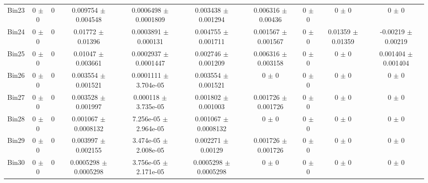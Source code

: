 \begin{tabular}{@{\extracolsep{4pt}}lccccccccc@{}}
     Bin23 & 0 $\pm$ 0 & 0 & 0.009754 $\pm$ 0.004548 & 0.0006498 $\pm$ 0.0001809 & 0.003438 $\pm$ 0.001294 & 0.006316 $\pm$ 0.00436 & 0 $\pm$ 0 & 0 $\pm$ 0 & 0 $\pm$ 0 \\ 
     Bin24 & 0 $\pm$ 0 & 0 & 0.01772 $\pm$ 0.01396 & 0.0003891 $\pm$ 0.000131 & 0.004755 $\pm$ 0.001711 & 0.001567 $\pm$ 0.001567 & 0 $\pm$ 0 & 0.01359 $\pm$ 0.01359 & -0.00219 $\pm$ 0.00219 \\ 
     Bin25 & 0 $\pm$ 0 & 0 & 0.01047 $\pm$ 0.003661 & 0.0002937 $\pm$ 0.0001447 & 0.002746 $\pm$ 0.001209 & 0.006316 $\pm$ 0.003158 & 0 $\pm$ 0 & 0 $\pm$ 0 & 0.001404 $\pm$ 0.001404 \\ 
     Bin26 & 0 $\pm$ 0 & 0 & 0.003554 $\pm$ 0.001521 & 0.0001111 $\pm$ 3.704e-05 & 0.003554 $\pm$ 0.001521 & 0 $\pm$ 0 & 0 $\pm$ 0 & 0 $\pm$ 0 & 0 $\pm$ 0 \\ 
     Bin27 & 0 $\pm$ 0 & 0 & 0.003528 $\pm$ 0.001997 & 0.000118 $\pm$ 3.735e-05 & 0.001802 $\pm$ 0.001003 & 0.001726 $\pm$ 0.001726 & 0 $\pm$ 0 & 0 $\pm$ 0 & 0 $\pm$ 0 \\ 
     Bin28 & 0 $\pm$ 0 & 0 & 0.001067 $\pm$ 0.0008132 & 7.256e-05 $\pm$ 2.964e-05 & 0.001067 $\pm$ 0.0008132 & 0 $\pm$ 0 & 0 $\pm$ 0 & 0 $\pm$ 0 & 0 $\pm$ 0 \\ 
     Bin29 & 0 $\pm$ 0 & 0 & 0.003997 $\pm$ 0.002155 & 3.474e-05 $\pm$ 2.008e-05 & 0.002271 $\pm$ 0.00129 & 0.001726 $\pm$ 0.001726 & 0 $\pm$ 0 & 0 $\pm$ 0 & 0 $\pm$ 0 \\ 
     Bin30 & 0 $\pm$ 0 & 0 & 0.0005298 $\pm$ 0.0005298 & 3.756e-05 $\pm$ 2.171e-05 & 0.0005298 $\pm$ 0.0005298 & 0 $\pm$ 0 & 0 $\pm$ 0 & 0 $\pm$ 0 & 0 $\pm$ 0 \\ 
\hline\hline
  \end{tabular}

